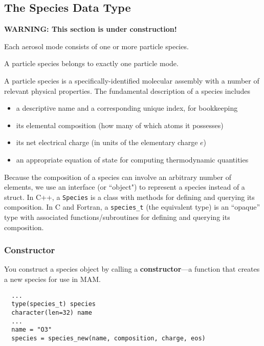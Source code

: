 \subsection{The Species Data Type}

{\bf WARNING: This section is under construction!}

Each aerosol mode consists of one or more particle species.

\begin{assume}
A particle species belongs to exactly one particle mode.
\end{assume}

A particle species is a specifically-identified molecular assembly with
a number of relevant physical properties. The fundamental description of a
species includes

\begin{itemize}
  \item a descriptive name and a corresponding unique index, for bookkeeping
  \item its elemental composition (how many of which atoms it possesses)
  \item its net electrical charge (in units of the elementary charge $e$)
  \item an appropriate equation of state for computing thermodynamic quantities
\end{itemize}

Because the composition of a species can involve an arbitrary number of
elements, we use an interface (or ``object") to represent a species instead of
a struct. In C++, a \verb|Species| is a class with methods for defining and
querying its composition. In C and Fortran, a \verb|species_t| (the equivalent
type) is an ``opaque'' type with associated functions/subroutines for defining
and querying its composition.

\subsubsection*{Constructor}

You construct a species object by calling a {\bf constructor}---a
function that creates a new species for use in MAM.

\begin{verbatim}
  ...
  type(species_t) species
  character(len=32) name
  ...
  name = "O3"
  species = species_new(name, composition, charge, eos)

\end{verbatim}

